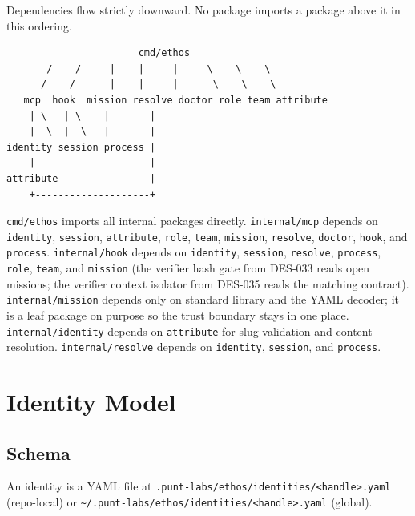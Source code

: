 \documentclass[a4paper,10pt]{article}
\newcommand{\pkg}[1]{\texttt{#1}}
\newcommand{\fpath}[1]{\texttt{#1}}
\begin{document}
Dependencies flow strictly downward.  No package imports a package
above it in this ordering.

\begin{verbatim}
                       cmd/ethos
       /    /     |    |     |     \    \    \
      /    /      |    |     |      \    \    \
   mcp  hook  mission resolve doctor role team attribute
    | \   | \    |       |
    |  \  |  \   |       |
identity session process |
    |                    |
attribute                |
    +--------------------+
\end{verbatim}

\pkg{cmd/ethos} imports all internal packages directly.
\pkg{internal/mcp} depends on \pkg{identity}, \pkg{session},
\pkg{attribute}, \pkg{role}, \pkg{team}, \pkg{mission},
\pkg{resolve}, \pkg{doctor}, \pkg{hook}, and \pkg{process}.
\pkg{internal/hook} depends on \pkg{identity}, \pkg{session},
\pkg{resolve}, \pkg{process}, \pkg{role}, \pkg{team}, and
\pkg{mission} (the verifier hash gate from DES-033 reads open
missions; the verifier context isolator from DES-035 reads the
matching contract).  \pkg{internal/mission} depends only on
standard library and the YAML decoder; it is a leaf package on
purpose so the trust boundary stays in one place.
\pkg{internal/identity} depends on \pkg{attribute} for slug
validation and content resolution.
\pkg{internal/resolve} depends on \pkg{identity}, \pkg{session},
and \pkg{process}.

\section{Identity Model}

\subsection{Schema}

An identity is a YAML file at
\fpath{.punt-labs/ethos/identities/<handle>.yaml} (repo-local) or
\fpath{\~{}/.punt-labs/ethos/identities/<handle>.yaml} (global).
\end{document}
